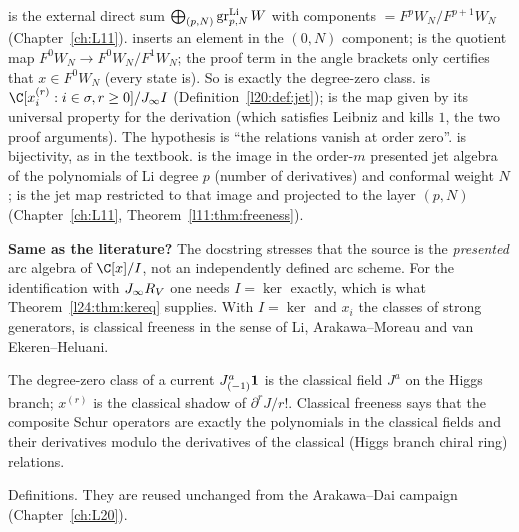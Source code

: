 \begin{dictionary}
 is the external direct sum $\bigoplus_{(p,N)}\operatorname{gr}^{\mathrm{Li}}_{p,N}W$ with
components $=F^pW_N/F^{p+1}W_N$ (Chapter~\ref{ch:L11}). 
inserts an element in the $(0,N)$ component;  is the quotient map $F^0W_N\to F^0W_N/F^1W_N$; the
proof term in the angle brackets only certifies that $x\in F^0W_N$ (every state is). So
 is exactly the degree-zero class.
 is $\C[x_i^{(r)}:i\in\sigma,r\ge0]/\ltwentyfourJ I$ (Definition~\ref{l20:def:jet});
 is the map given by its universal property for the derivation
 (which satisfies Leibniz and kills $1$, the two proof arguments).
The hypothesis  is ``the relations vanish at order zero''.  is
bijectivity, as in the textbook.  is the image in the
order-$m$ presented jet algebra of the polynomials of Li degree $p$ (number of derivatives) and conformal
weight $N$;  is the jet map restricted to that image and projected to the
layer $(p,N)$ (Chapter~\ref{ch:L11}, Theorem~\ref{l11:thm:freeness}).

\textbf{Same as the literature?} The docstring stresses that the source is the \emph{presented} arc
algebra of $\C[x]/I$, not an independently defined arc scheme. For the identification with
$J_\infty R_V$ one needs $I=\ker$ exactly, which is what Theorem~\ref{l24:thm:kereq} supplies. With
$I=\ker$ and $x_i$ the classes of strong generators,  is classical
freeness in the sense of Li, Arakawa--Moreau and van Ekeren--Heluani.
\end{dictionary}

\begin{physics}
The degree-zero class of a current $J^a_{(-1)}\mathbf 1$ is the classical field $J^a$ on the Higgs
branch; $x^{(r)}$ is the classical shadow of $\partial^rJ/r!$. Classical freeness says that the composite
Schur operators are exactly the polynomials in the classical fields and their derivatives modulo the
derivatives of the classical (Higgs branch chiral ring) relations.
\end{physics}

\begin{status}
Definitions. They are reused unchanged from the Arakawa--Dai campaign (Chapter~\ref{ch:L20}).
\end{status}

